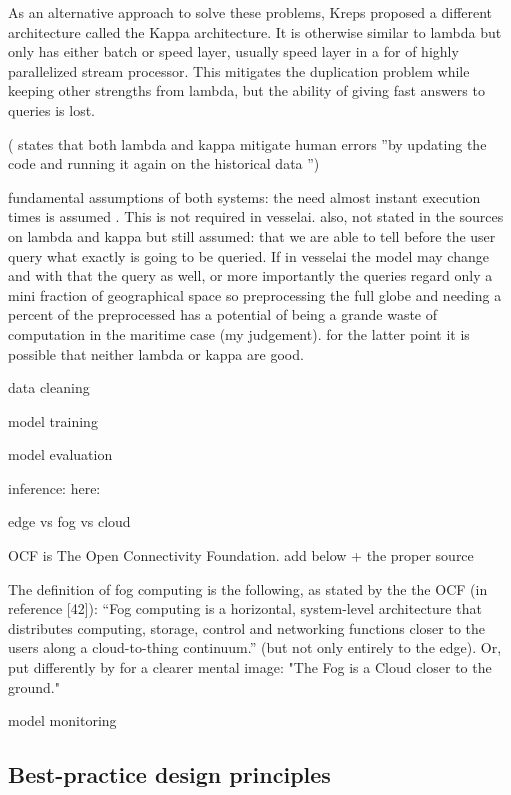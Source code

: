As an alternative approach to solve these problems, Kreps proposed a different architecture called the Kappa architecture. It is otherwise similar to lambda but only has either batch or speed layer, usually speed layer in a for of highly parallelized stream processor. This mitigates the duplication problem while keeping other strengths from lambda, but the ability of giving fast answers to queries is lost.

(\cite{D1.1} states that both lambda and kappa mitigate human errors ''by  updating  the  code  and  running  it  again  on  the historical  data '')


fundamental assumptions of both systems:  the need almost instant execution times is assumed \cite{lambdakappa}. This is not required in vesselai. also, not stated in the sources on lambda and kappa but still assumed: that we are able to tell before the user query what exactly is going to be queried. If in vesselai the model may change and with that the query as well, or more importantly the queries regard only a mini fraction of geographical space so preprocessing the full globe and needing a percent of the preprocessed has a potential of being a grande waste of computation in the maritime case (my judgement). for the latter point it is possible that neither lambda or kappa are good.

data cleaning

model training

model evaluation

inference: here:

edge vs fog vs cloud

OCF is The Open Connectivity Foundation. add below + the proper source

The definition of fog computing is the following, as stated by the the OCF (in \cite{fogsurvey} reference [42]): “Fog computing is a horizontal, system-level architecture that distributes computing, storage, control and networking functions closer to the users along a cloud-to-thing continuum.” (but not only entirely to the edge). Or, put differently by \cite{fogsurvey} for a clearer mental image: "The Fog is a Cloud closer to the ground."

model monitoring


\subsection{Best-practice design principles}


